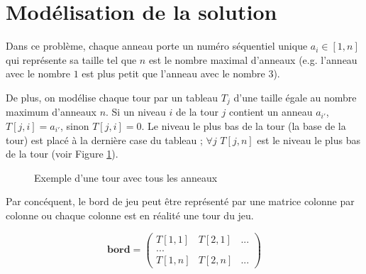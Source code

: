 \section{Modélisation de la solution}
Dans ce problème, chaque anneau porte un numéro séquentiel unique $a_i \in [1, n]$ qui représente sa taille tel que $n$ est le nombre maximal d'anneaux (e.g. l'anneau avec le nombre $1$ est plus petit que l'anneau avec le nombre $3$).
\par
De plus, on modélise chaque tour par un tableau $T_j$ d'une taille égale au nombre maximum d'anneaux $n$. Si un niveau $i$ de la tour $j$ contient un anneau $a_{i'}$, $T[j, i] = a_{i'}$, sinon $T[j, i] = 0$. Le niveau le plus bas de la tour (la base de la tour) est placé à la dernière case du tableau ; $\forall j$ $T[j, n]$ est le niveau le plus bas de la tour (voir Figure \ref{fig:rep_tour}).

\begin{figure}[h!]
    \begin{center}
        \caption{Exemple d'une tour avec tous les anneaux}
        \label{fig:rep_tour}
    \end{center}
\end{figure}

\par
Par concéquent, le bord de jeu peut être représenté par une matrice colonne par colonne ou chaque colonne est en réalité une tour du jeu.

$$
\mathbf{bord} = 
\begin{pmatrix}
    T[1, 1] & T[2, 1] & ... \\
    ... \\
    T[1, n] & T[2, n] & ...
\end{pmatrix}$$

